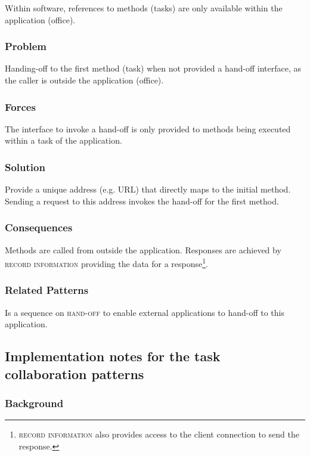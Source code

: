 \documentclass[prodmode]{style/acmlarge}
\begin{document}
Within software, references to methods (tasks) are only available within the
application (office).

\subsubsection*{\textbf{Problem}} Handing-off to the first method (task) when not
provided a hand-off interface, as the caller is outside the application
(office).

\subsubsection*{Forces} The interface to invoke a hand-off is only provided to
methods being executed within a task of the application.

\subsubsection*{\textbf{Solution}} Provide a unique address (e.g. URL) that directly maps
to the initial method.  Sending a request to this address invokes the hand-off
for the first method.

\subsubsection*{Consequences} Methods are called from outside the application. 
Responses are achieved by \textsc{record information} providing the data for a
response\footnote{\textsc{record information} also provides access to the client
connection to send the response.}.

\subsubsection*{Related Patterns} Is a sequence on \textsc{hand-off} to enable
external applications to hand-off to this application.



\subsection{Implementation notes for the task collaboration patterns}

\subsubsection*{Background}
\end{document}
